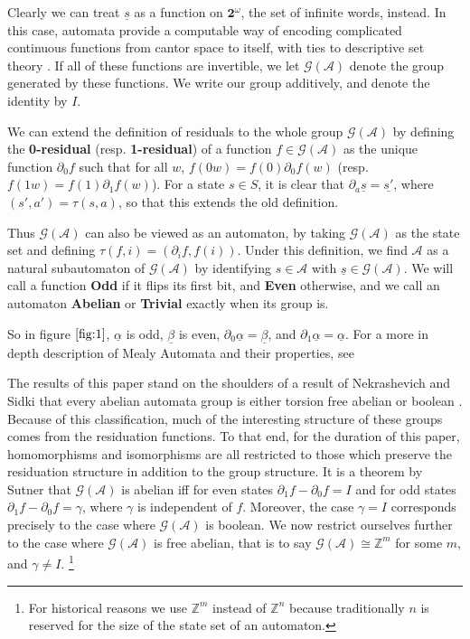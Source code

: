\documentclass[runningheads]{llncs}
\newcommand{\A}{\mathcal{A}}
\newcommand{\G}{\mathcal{G}}
\newcommand{\Z}{\mathbb{Z}}
\newcommand{\2}{\textbf{2}}
\newcommand{\del}{\partial}
\begin{document}
Clearly we can treat $\underline{s}$ as a function 
on $\2^\omega$, the set of infinite words, instead. In this case, automata 
provide a computable way of encoding complicated continuous functions from 
cantor space to itself, with ties to descriptive set theory%
\cite{skrzypczak15:descriptive}. If all of these functions are invertible, 
we let $\G(\A)$ denote the group generated by these functions. We write our
group additively, and denote the identity by $I$.

We can extend the definition of residuals to the whole group $\G(\A)$ by
defining the \textbf{0-residual} (resp. \textbf{1-residual}) of a 
function $f \in \G(\A)$ as the unique function 
$\del_0 f$ such that for all $w$, $f(0w) = f(0) \del_0 f(w)$ 
(resp. $f(1w) = f(1) \del_1 f(w)$). 
For a state $s \in S$, it is clear that 
$\del_a \underline{s} = \underline{s'}$, where $(s',a') = \tau(s,a)$, so
that this extends the old definition. 

Thus $\G(\A)$ can also be viewed as an automaton, by taking $\G(\A)$ 
as the state set and defining $\tau(f,i) = (\del_i f, f(i))$. Under this
definition, we find $\A$ as a natural subautomaton of $\G(\A)$ by identifying 
$s \in \A$ with $\underline{s} \in \G(\A)$.
We will call a function \textbf{Odd} if it flips its first bit, and 
\textbf{Even} otherwise, and we call an automaton \textbf{Abelian} or 
\textbf{Trivial} exactly when its group is. 

So in figure $\ref{fig:1}$, $\underline{\alpha}$ is odd, $\underline{\beta}$ 
is even, $\del_0 \underline{\alpha} = \underline{\beta}$, 
and $\del_1 \underline{\alpha} = \underline{\alpha}$.
For a more in depth description of Mealy Automata and their properties, 
see \cite{Sakarovitch09:automata_theory,Holcombe, SutnerLewi12:iter_inver_bin_trans}

The results of this paper stand on the shoulders of a result of Nekrashevich and 
Sidki that every abelian automata group is either torsion free abelian or 
boolean \cite{NekrashevychSidki04:automorphisms}. Because of this classification, 
much of the interesting structure of these groups comes from the residuation
functions. To that end, for the duration of this paper, 
homomorphisms and isomorphisms are all restricted to those 
which preserve the residuation structure in addition to the group structure.
It is a theorem by Sutner \cite{Sutner18:abelian_automata} 
that $\G(\A)$ is abelian iff for even states $\del_1 f - \del_0 f = I$ 
and for odd states $\del_1 f - \del_0 f = \gamma$, where $\gamma$ is 
independent of $f$. Moreover, the case $\gamma = I$ corresponds 
precisely to the case where $\G(\A)$ is boolean.
We now restrict ourselves further to the case where $\G(\A)$ is 
free abelian, that is to say $\G(\A) \cong \Z^m$ for some $m$,
and $\gamma \not = I$.%
\footnote%
{%
  For historical reasons we use $\Z^m$ instead of $\Z^n$ because 
  traditionally $n$ is reserved for the size of the state set of 
  an automaton.
}
\end{document}
